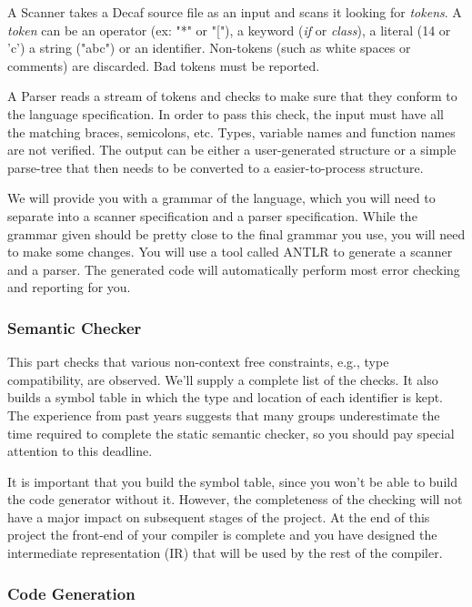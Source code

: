 A Scanner takes a Decaf source file as an input and scans it looking
for {\it tokens}. A {\it token} can be an operator (ex: "*" or "["),
a keyword ({\it if} or  {\it class}), a literal (14 or 'c') a string
("abc") or an identifier. Non-tokens (such as white spaces or
comments) are discarded. Bad tokens must be reported.

A Parser reads a stream of tokens and checks to make sure that they
conform to the language specification. In order to pass this check,
the input must have all the matching braces, semicolons, etc. Types,
variable names and function names are not verified. The output can
be either a user-generated structure or a simple parse-tree that then
needs to be converted to a easier-to-process structure.

We will provide you with a grammar of the language, which you will need to
separate into a scanner specification and a parser specification. While the
grammar given should be pretty close to the final grammar you use, you will
need to make some changes. You will use a tool called ANTLR to generate a
scanner and a parser. The generated code will automatically perform most
error checking and reporting for you.

\subsubsection*{Semantic Checker}

This part checks that various non-context free constraints, e.g., type
compatibility, are observed. We'll supply a complete list of the
checks. It also builds a symbol table in which the type and location
of each identifier is kept. The experience from past years suggests
that many groups underestimate the time required to complete the
static semantic checker, so you should pay special attention to this
deadline.

It is important that you build the symbol table, since you won't be
able to build the code generator without it.  However, the
completeness of the checking will not have a major impact on
subsequent stages of the project. At the end of this project the
front-end of your compiler is complete and you have designed the
intermediate representation (IR) that will be used by the rest of the
compiler.

\subsubsection*{Code Generation}

